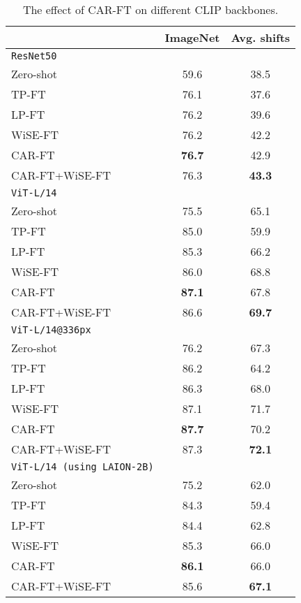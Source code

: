 \documentclass[pdflatex,sn-basic,iicol]{sn-jnl}
\theoremstyle{thmstyleone}\newtheorem{theorem}{Theorem}\newtheorem{proposition}[theorem]{Proposition}
\theoremstyle{thmstyletwo}\newtheorem{example}{Example}\newtheorem{remark}{Remark}
\theoremstyle{thmstylethree}\newtheorem{definition}{Definition}
\begin{document}
\begin{table}[t]\footnotesize
\begin{center}
\caption{The effect of CAR-FT on different CLIP backbones. } \label{tab:backbone}
\begin{tabular}{lc|c}
\toprule
 & ImageNet & Avg. shifts \\
\midrule
\texttt{ResNet50} &  &  \\
\quad  Zero-shot & 59.6 & 38.5 \\
\quad  TP-FT & 76.1 & 37.6 \\
\quad  LP-FT & 76.2 & 39.6 \\
\quad  WiSE-FT & 76.2 & 42.2 \\
\rowcolor{tabhighlight}
\quad  CAR-FT & \textbf{76.7} & 42.9 \\
\rowcolor{tabhighlight}
\quad  CAR-FT+WiSE-FT & 76.3 & \textbf{43.3} \\
\midrule
\texttt{ViT-L/14} & & \\
\quad  Zero-shot & 75.5 & 65.1 \\
\quad  TP-FT & 85.0 & 59.9 \\
\quad  LP-FT & 85.3 & 66.2 \\
\quad  WiSE-FT & 86.0 & 68.8 \\
\rowcolor{tabhighlight}
\quad  CAR-FT & \textbf{87.1} & 67.8 \\
\rowcolor{tabhighlight}
\quad  CAR-FT+WiSE-FT & 86.6 & \textbf{69.7} \\
\midrule
\texttt{ViT-L/14@336px} & & \\
\quad  Zero-shot & 76.2 & 67.3 \\
\quad  TP-FT & 86.2 & 64.2 \\
\quad  LP-FT & 86.3 & 68.0 \\
\quad  WiSE-FT & 87.1 & 71.7 \\
\rowcolor{tabhighlight}
\quad  CAR-FT & \textbf{87.7} & 70.2 \\
\rowcolor{tabhighlight}
\quad  CAR-FT+WiSE-FT & 87.3 & \textbf{72.1} \\
\midrule
\texttt{ViT-L/14 (using LAION-2B)} & & \\
\quad  Zero-shot & 75.2 & 62.0 \\
\quad  TP-FT & 84.3 & 59.4 \\
\quad  LP-FT & 84.4 & 62.8 \\
\quad  WiSE-FT & 85.3 & 66.0 \\
\rowcolor{tabhighlight}
\quad  CAR-FT & \textbf{86.1} & 66.0 \\
\rowcolor{tabhighlight}
\quad  CAR-FT+WiSE-FT & 85.6 & \textbf{67.1} \\

\end{tabular}
\end{center}
\end{table}
\end{document}
